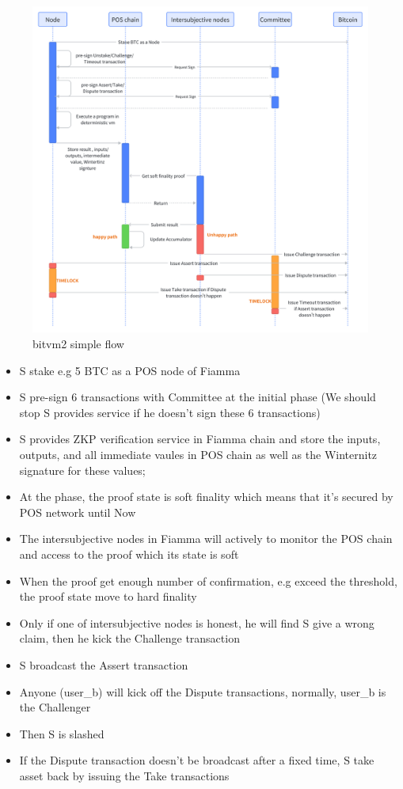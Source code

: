 \begin{figure}[ht] 
    \centering  
    \includegraphics[width=0.85\columnwidth]{images/bitvm2 simple flow.png} 
    \caption{bitvm2 simple flow}
    \label{fig:bitvm2 simple flow}
\end{figure}

\begin{itemize}
    \item S stake e.g 5 BTC as a POS node of Fiamma
    \item S pre-sign 6 transactions with Committee at the initial phase (We should stop S provides service if he doesn't sign these 6 transactions)
    \item S provides ZKP verification service in Fiamma chain and store the inputs, outputs, and all immediate vaules in POS chain as well as the Winternitz signature for these values;
    \item At the phase, the proof state is soft finality which means that it's secured by POS network until Now
    \item The intersubjective nodes in Fiamma will actively to monitor the POS chain and access to the proof which its state is soft
    \item When the proof get enough number of confirmation, e.g exceed the threshold, the proof state move to hard finality
    \item Only if one of intersubjective nodes is honest, he will find S give a wrong claim, then he kick the Challenge transaction
    \item S broadcast the Assert transaction
    \item Anyone (user\_b) will kick off the Dispute transactions, normally, user\_b is the Challenger
    \item Then S is slashed
    \item If the Dispute transaction doesn't be broadcast after a fixed time, S take asset back by issuing the Take transactions
\end{itemize}

